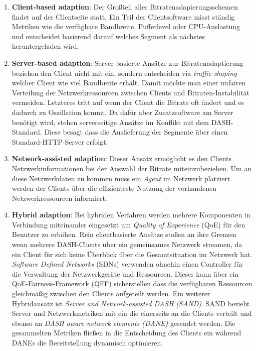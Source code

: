 \documentclass[paper = a4, fontsize = 12pt, parskip = half]{scrartcl} %
\begin{document}
\begin{enumerate}
	\item \textbf{Client-based adaption}: Der Großteil aller Bitratenadapierungsschemen findet auf der Clientseite statt. Ein Teil der Clientsoftware misst ständig Metriken wie die verfügbare Bandbreite, Pufferlevel oder CPU-Auslastung und entscheidet basierend darauf welches Segment als nächstes heruntergeladen wird. 
	\item \textbf{Server-based adaption}: Server-basierte Ansätze zur Bitratenadaptierung beziehen den Client nicht mit ein, sondern entscheiden via \textit{traffic-shaping} welcher Client wie viel Bandbreite erhält. Damit möchte man einer unfairen Verteilung der Netzwerkressourcen zwischen Clients und Bitraten-Instabilität vermeiden. Letzteres tritt auf wenn der Client die Bitrate oft ändert und es dadurch zu Oszillation kommt. Da dafür aber Zusatzsoftware am Server benötigt wird, stehen serverseitige Ansätze im Konflikt mit dem DASH-Standard. Diese besagt dass die Auslieferung der Segmente über einen Standard-HTTP-Server erfolgt.
	\item \textbf{Network-assisted adaption}: Dieser Ansatz ermöglicht es den Clients Netzwerkinformationen bei der Auswahl der Bitrate miteinzubeziehen. Um an diese Netzwerkdaten zu kommen muss ein \textit{Agent} im Netzwerk platziert werden der Clients über die effizienteste Nutzung der vorhandenen Netzwerkressourcen informiert.
	\item \textbf{Hybrid adaption}: Bei hybriden Verfahren werden mehrere Komponenten in Verbindung miteinander eingesetzt um \textit{Quality of Experience} (QoE) für den Benutzer zu erhöhen. Rein clientbasierte Ansätze stoßen an ihre Grenzen wenn mehrere DASH-Clients über ein gemeinsames Netzwerk streamen, da ein Client für sich keine Überblick über die Gesamtsituation im Netzwerk hat. \textit{Software Defined Networks} (SDNs) verwenden ohnehin einen Controller für die Verwaltung der Netzwerkgeräte und Ressourcen. Dieser kann über ein QoE-Fairness-Framework (QFF) sicherstellen dass die verfügbaren Ressourcen gleichmäßig zwischen den Clients aufgeteilt werden. Ein weiterer Hybridansatz ist \textit{Server and Network-assisted DASH (SAND)}. SAND bezieht Server und Netzwerkmetriken mit ein die einerseits an die Clients verteilt und ebenso an \textit{DASH aware network elements (DANE)} gesendet werden. Die gesammelten Metriken fließen in die Entscheidung des Clients ein während DANEs die Bereitstellung dynamisch optimieren.
\end{enumerate}
\end{document}
